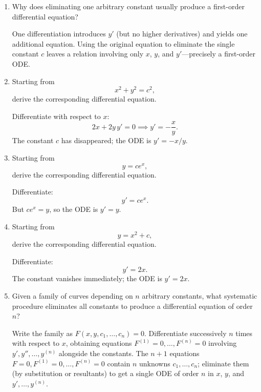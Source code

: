 \documentclass{self-check}
\begin{document}
\begin{enumerate}[leftmargin=*, itemsep=8pt]
  \item Why does eliminating one arbitrary constant usually produce a
    first-order differential equation?

    \begin{answer} One differentiation introduces $y'$ (but no
      higher derivatives) and yields one additional equation.  Using
      the original equation to eliminate the single constant $c$ leaves
      a relation involving only $x$, $y$, and $y'$---precisely a first-order ODE.
    \end{answer}

  \item Starting from \[ x^2+y^2=c^2, \] derive the corresponding
    differential equation.

    \begin{answer} Differentiate with respect to $x$:
      \[
        2x + 2y\,y' = 0 \implies y' = -\frac{x}{y}.
      \]
      The constant $c$ has disappeared; the ODE is $y' = -x/y$.
    \end{answer}

  \item Starting from \[ y=ce^x, \] derive the corresponding
    differential equation.

    \begin{answer} Differentiate:
      \[
        y' = ce^x.
      \]
      But $ce^x = y$, so the ODE is $y' = y$.
    \end{answer}

  \item Starting from \[ y=x^2+c, \] derive the corresponding
    differential equation.

    \begin{answer} Differentiate:
      \[
        y' = 2x.
      \]
      The constant vanishes immediately; the ODE is $y'=2x$.
    \end{answer}

  \item Given a family of curves depending on $n$ arbitrary
    constants, what systematic procedure eliminates all constants to
    produce a differential equation of order~$n$?

    \begin{answer} Write the family as $F(x,y,c_1,\ldots,c_n)=0$.
      Differentiate successively $n$ times with respect to $x$,
      obtaining equations $F^{(1)}=0,\ldots,F^{(n)}=0$ involving
      $y',y'',\ldots,y^{(n)}$ alongside the constants.  The $n+1$
      equations $F=0,F^{(1)}=0,\ldots,F^{(n)}=0$ contain $n$ unknowns
      $c_1,\ldots,c_n$; eliminate them (by substitution or resultants)
      to get a single ODE of order $n$ in $x$, $y$, and $y',\ldots,y^{(n)}$.
    \end{answer}


\end{enumerate}
\end{document}
